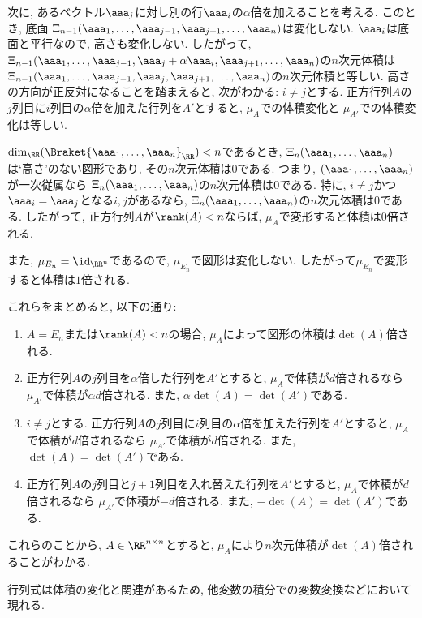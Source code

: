次に,
あるベクトル$\aaa_j$に対し別の行$\aaa_i$の$\alpha$倍を加えることを考える.
このとき, 
底面
$\Xi_{n-1}(\aaa_1,\ldots,\aaa_{j-1},\aaa_{j+1},\ldots,\aaa_n)$は変化しない.
$\aaa_i$は底面と平行なので,
高さも変化しない.
したがって,
$\Xi_{n-1}(\aaa_1,\ldots,\aaa_{j-1},\aaa_{j}+\alpha\aaa_i,\aaa_{j+1},\ldots,\aaa_n)$の$n$次元体積は
$\Xi_{n-1}(\aaa_1,\ldots,\aaa_{j-1},\aaa_{j},\aaa_{j+1},\ldots,\aaa_n)$の$n$次元体積と等しい.
高さの方向が正反対になることを踏まえると, 次がわかる:
$i\neq j$とする.
正方行列$A$の$j$列目に$i$列目の$\alpha$倍を加えた行列を$A'$とすると,
$\mu_{A}$での体積変化と
$\mu_{A'}$での体積変化は等しい.


$\dim_\RR(\Braket{\aaa_1,\ldots,\aaa_n}_\RR)<n$であるとき,
$\Xi_n(\aaa_1,\ldots,\aaa_n)$は`高さ'のない図形であり,
その$n$次元体積は$0$である.
つまり, $(\aaa_1,\ldots,\aaa_n)$が一次従属なら
$\Xi_n(\aaa_1,\ldots,\aaa_n)$の$n$次元体積は$0$である.
特に, $i\neq j$かつ$\aaa_i=\aaa_j$となる$i,j$があるなら,
$\Xi_n(\aaa_1,\ldots,\aaa_n)$の$n$次元体積は$0$である.
したがって,
正方行列$A$が$\rank(A)<n$ならば,
$\mu_{A}$で変形すると体積は$0$倍される.

また, $\mu_{E_n}=\id_{\RR^n}$であるので,
$\mu_{E_n}$で図形は変化しない.
したがって$\mu_{E_n}$で変形すると体積は$1$倍される.

これらをまとめると, 以下の通り:
\begin{enumerate}
\item
  $A=E_n$または$\rank(A)<n$の場合,
  $\mu_A$によって図形の体積は$\det(A)$倍される.
\item
  正方行列$A$の$j$列目を$\alpha$倍した行列を$A'$とすると,
  $\mu_{A}$で体積が$d$倍されるなら
  $\mu_{A'}$で体積が$\alpha d$倍される.
  また, $\alpha \det(A)=\det(A')$である.
\item
  $i\neq j$とする.
  正方行列$A$の$j$列目に$i$列目の$\alpha$倍を加えた行列を$A'$とすると,
  $\mu_{A}$で体積が$d$倍されるなら
  $\mu_{A'}$で体積が$d$倍される.
  また, $\det(A)=\det(A')$である.
\item
  正方行列$A$の$j$列目と$j+1$列目を入れ替えた行列を$A'$とすると,
  $\mu_{A}$で体積が$d$倍されるなら
  $\mu_{A'}$で体積が$-d$倍される.
  また, $-\det(A)=\det(A')$である.
\end{enumerate}
これらのことから,
$A\in\RR^{n\times n}$とすると,
$\mu_{A}$により$n$次元体積が$\det(A)$倍されることがわかる.


\begin{remark}
  行列式は体積の変化と関連があるため,
  他変数の積分での変数変換などにおいて現れる.
\end{remark}


